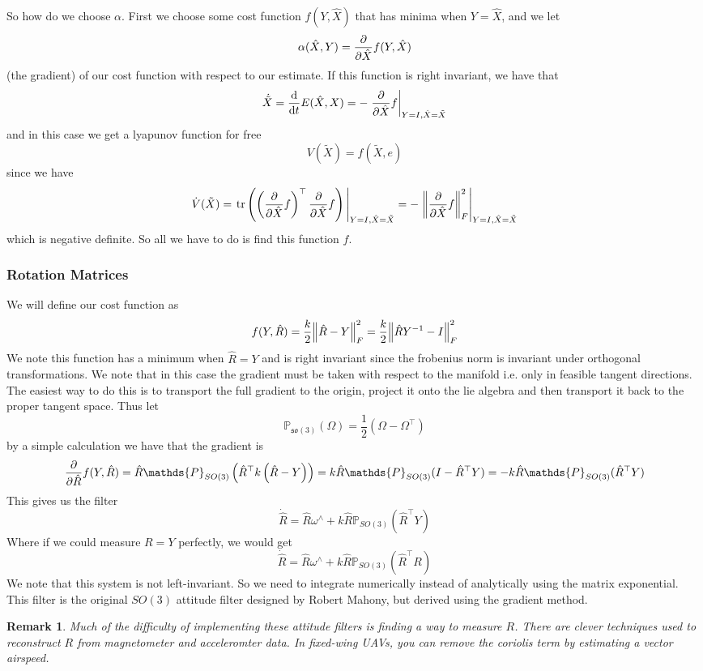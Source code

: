 \documentclass[a4paper]{article}
\newtheorem*{rem}{Remark}
\begin{document}
So how do we choose $\alpha$. First we choose some cost function $f(Y, \hat{X})$ that has minima when $Y = \hat{X}$, and we let
\[
  \alpha(\hat{X}, Y) = \pdv{}{\hat{X}} f(Y, \hat{X})
\]
(the gradient) of our cost function with respect to our estimate. If this function is right invariant, we have that
\[
  \dot{\tilde{X}} = \dv{}{t}E(\hat{X}, X) = -\eval{\pdv{}{\hat{X}}f}_{Y=I, \hat{X} = \tilde{X}}
\]
and in this case we get a lyapunov function for free
\[
  V(\tilde{X}) = f(\tilde{X}, e)
\]
since we have
\[
  \dot{V}(\tilde{X}) = \eval{\text{tr}\left( \left(\pdv{}{\hat{X}}f \right)^\top \pdv{}{\hat{X}}f\right)}_{Y=I, \hat{X} = \tilde{X}} = - \eval{\norm{\pdv{}{\hat{X}}f}_F^2}_{Y=I, \hat{X} = \tilde{X}}
\]
which is negative definite. So all we have to do is find this function $f$.

\subsubsection*{Rotation Matrices}%
We will define our cost function as 
\[
  f(Y, \hat{R}) = \frac{k}{2}\norm{\hat{R} - Y}^2_F = \frac{k}{2}\norm{\hat{R}Y^{-1} - I}_F^2
\]
We note this function has a minimum when $\hat{R}= Y$ and  is right invariant since the frobenius norm is invariant under orthogonal transformations. We note that in this case the gradient must be taken with respect to the manifold i.e. only in feasible tangent directions. The easiest way to do this is to transport the full gradient to the origin, project it onto the lie algebra and then transport it back to the proper tangent space. Thus let 
\[
  \mathds{P}_{\mathfrak{so}(3)}(\Omega) = \frac{1}{2}(\Omega - \Omega^\top)
\]
by a simple calculation we have that the gradient is
\[
  \pdv{}{\hat{R}} f(Y, \hat{R}) = \hat{R} \mathds{P}_{SO(3)} \left( \hat{R}^\top k\left(\hat{R} - Y \right) \right) = k\hat{R}\mathds{P}_{SO(3)}(I - \hat{R}^\top Y) = -k\hat{R}\mathds{P}_{SO(3)}(\hat{R}^\top Y)
\]
This gives us the filter
\[
  \dot{\hat{R}} = \hat{R} \omega^\wedge + k \hat{R}\mathds{P}_{SO(3)}(\hat{R}^\top Y)
\]
Where if we could measure $R = Y$ perfectly, we would get 
\[
  \dot{\hat{R}} = \hat{R} \omega^\wedge + k \hat{R}\mathds{P}_{SO(3)}(\hat{R}^\top R)
\]
We note that this system is not left-invariant. So we need to integrate numerically instead of analytically using the matrix exponential. This filter is the original $SO(3)$ attitude filter designed by Robert Mahony, but derived using the gradient method.

\begin{rem}
  Much of the difficulty of implementing these attitude filters is finding a way to measure $R$. There are clever techniques used to reconstruct $R$ from magnetometer and acceleromter data. In fixed-wing UAVs, you can remove the coriolis term by estimating a vector airspeed.
\end{rem}
\end{document}
